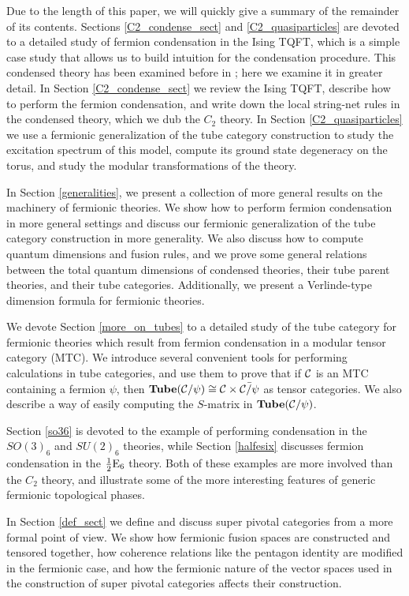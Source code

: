 Due to the length of this paper, we will quickly give a summary of the remainder of its contents.
Sections \ref{C2_condense_sect} and \ref{C2_quasiparticles} are devoted to a detailed study of 
fermion condensation in the Ising TQFT, which is a simple case study that allows us to build intuition for the condensation procedure.
This condensed theory has been examined before in \cite{bhardwaj2016, kapustin2017}; 
here we examine it in greater detail. 
In Section \ref{C2_condense_sect} we review the Ising TQFT, describe how to perform the 
fermion condensation, and write down the local string-net rules in the condensed theory, 
which we dub the $C_2$ theory. 
In Section \ref{C2_quasiparticles} we use a fermionic generalization of the tube category 
construction to study the excitation spectrum of this model, compute its ground state 
degeneracy on the torus, and study the modular transformations %
of the theory. 

In Section \ref{generalities}, we present a collection of more general results
on the machinery of fermionic theories. 
We show how to perform fermion condensation in more general settings
and discuss our fermionic generalization 
of the tube category construction in more generality.
We also discuss how to compute quantum dimensions and fusion rules,
and we prove some general
relations between the total quantum dimensions of condensed theories, their 
tube parent theories, and their tube categories.
Additionally, we present a Verlinde-type
dimension formula for fermionic theories.

We devote Section \ref{more_on_tubes} to a detailed study of the tube category 
for fermionic theories which result from fermion condensation in a modular tensor category (MTC). 
We introduce several convenient tools for performing calculations in tube categories, 
and use them to prove that if $\mathcal{C}$ is an MTC containing a fermion $\psi$, then
$\textbf{Tube}(\mathcal{C}/\psi)\cong \mathcal{C}\times \bar{\mathcal{C}/\psi}$ as tensor 
categories. We also describe a way of easily computing the $S$-matrix in 
$\textbf{Tube}(\mathcal{C}/\psi)$. 

Section \ref{so36} is devoted to the example of performing condensation in the $SO(3)_6$ 
and $SU(2)_6$ theories, while Section \ref{halfesix} discusses fermion condensation in the $
\frac{1}{2}\text{E}_6$ theory. 
Both of these examples are more involved than the $C_2$ theory, 
and illustrate some of the more interesting features of generic fermionic topological phases. 

In Section \ref{def_sect} we define and discuss super pivotal categories from a more formal point of view. 
We show how fermionic fusion spaces are constructed and tensored together, how 
coherence relations like the pentagon identity are modified in the fermionic case, 
and how the fermionic nature of the vector spaces used in the construction of super 
pivotal categories affects their construction. 


